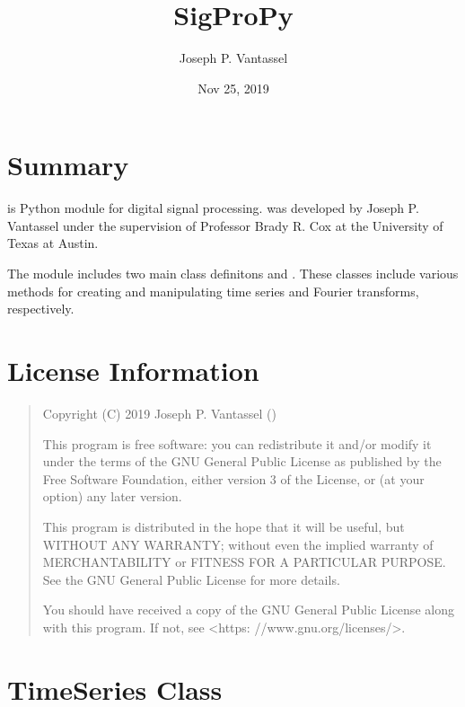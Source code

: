 \documentclass[letterpaper,10pt,english,openany,oneside]{sphinxmanual}
\title{SigProPy}
\date{Nov 25, 2019}
\author{Joseph P.\@{} Vantassel}
\begin{document}
\pagestyle{empty}
\sphinxmaketitle
\pagestyle{plain}
\sphinxtableofcontents
\pagestyle{normal}
\label{\detokenize{index::doc}}



\chapter{Summary}
\label{\detokenize{index:summary}}
 is Python module for digital signal processing.  was
developed by Joseph P. Vantassel under the supervision of Professor Brady R.
Cox at the University of Texas at Austin.

The module includes two main class definitons  and
. These classes include various methods for creating and
manipulating time series and Fourier transforms, respectively.


\chapter{License Information}
\label{\detokenize{index:license-information}}\begin{quote}

Copyright (C) 2019 Joseph P. Vantassel ()

This program is free software: you can redistribute it and/or modify
it under the terms of the GNU General Public License as published by
the Free Software Foundation, either version 3 of the License, or
(at your option) any later version.

This program is distributed in the hope that it will be useful,
but WITHOUT ANY WARRANTY; without even the implied warranty of
MERCHANTABILITY or FITNESS FOR A PARTICULAR PURPOSE.  See the
GNU General Public License for more details.

You should have received a copy of the GNU General Public License
along with this program.  If not, see \textless{}https: //www.gnu.org/licenses/\textgreater{}.
\end{quote}


\chapter{TimeSeries Class}
\label{\detokenize{index:timeseries-class}}
\end{document}
